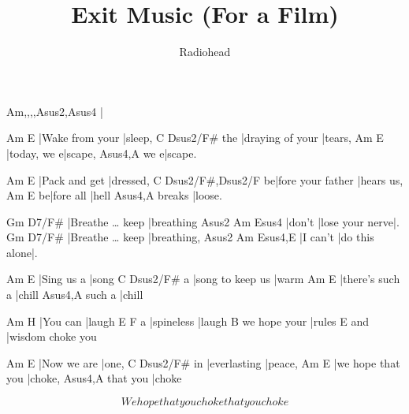 \documentclass{song}
\author{Radiohead}
\title{Exit Music (For a Film)}
\begin{document}
\strophe
Am,,,,Asus2,Asus4
|
\endstrophe

\begin{multicols}{2}

\strophe
Am              E
|Wake from your |sleep,
    C                Dsus2/F\#
the |draying of your |tears,
Am          E
|today, we e|scape,
    Asus4,A
we e|scape.
\endstrophe

\strophe
Am            E
|Pack and get |dressed,
  C                 Dsus2/F\#,Dsus2/F
be|fore your father |hears us,
  Am        E
be|fore all |hell
       Asus4,A
breaks |loose.
\endstrophe

\strophe
Gm                     D7/F\#
|Breathe \ldots{} keep |breathing
Asus2  Am              Esus4
|don't |lose your nerve|.
Gm                     D7/F\#
|Breathe \ldots{} keep |breathing,
Asus2    Am            Esus4,E
|I can't |do this alone|.
\endstrophe

\columnbreak

\strophe
Am         E
|Sing us a |song
  C                Dsus2/F\#
a |song to keep us |warm
Am              E
|there's such a |chill
       Asus4,A
such a |chill
\endstrophe

\strophe
Am       H
|You can |laugh
  E          F
a |spineless |laugh
             B
we hope your |rules
    E
and |wisdom choke you
\endstrophe

\strophe
Am          E
|Now we are |one,
   C            Dsus2/F\#
in |everlasting |peace,
Am                E
|we hope that you |choke,
         Asus4,A
that you |choke
\endstrophe

\strophe*
\[ We hope that you choke
that you choke \]
\endstrophe

\end{multicols}

\end{document}
